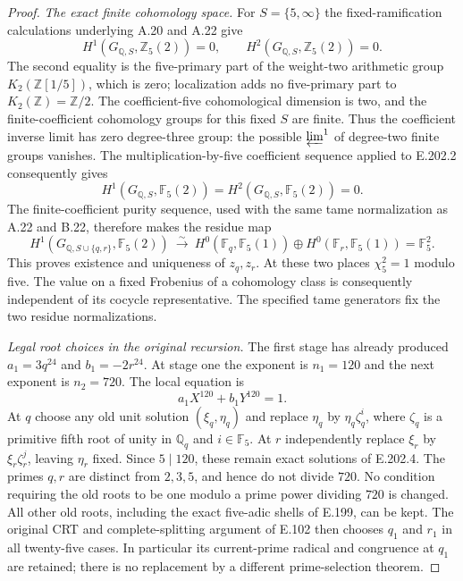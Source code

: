\begin{proof}
\emph{The exact finite cohomology space.}
For $S=\{5,\infty\}$ the fixed-ramification calculations underlying
A.20 and A.22 give
\[
 H^1(G_{\mathbb Q,S},\mathbb Z_5(2))=0,
 \qquad H^2(G_{\mathbb Q,S},\mathbb Z_5(2))=0.
 \tag{E.202.2}
\]
The second equality is the five-primary part of the weight-two
arithmetic group $K_2(\mathbb Z[1/5])$, which is zero; localization
adds no five-primary part to $K_2(\mathbb Z)=\mathbb Z/2$.
The coefficient-five cohomological dimension is two, and the
finite-coefficient cohomology groups for this fixed $S$ are finite.
Thus the coefficient inverse limit has zero degree-three group:
the possible $\varprojlim^1$ of degree-two finite groups vanishes.
The multiplication-by-five coefficient sequence applied to
E.202.2 consequently gives
\[
 H^1(G_{\mathbb Q,S},\mathbb F_5(2))=
 H^2(G_{\mathbb Q,S},\mathbb F_5(2))=0.
\]
The finite-coefficient purity sequence, used with the same tame
normalization as A.22 and B.22, therefore makes the residue map
\[
 H^1(G_{\mathbb Q,S\cup\{q,r\}},\mathbb F_5(2))
 \ \xrightarrow{\sim}\
 H^0(\mathbb F_q,\mathbb F_5(1))\oplus
 H^0(\mathbb F_r,\mathbb F_5(1))=\mathbb F_5^2.
 \tag{E.202.3}
\]
This proves existence and uniqueness of $z_q,z_r$.
At these two places $\chi_5^2=1$ modulo five.  The value on a
fixed Frobenius of a cohomology class is consequently independent
of its cocycle representative.  The specified tame generators
fix the two residue normalizations.

\emph{Legal root choices in the original recursion.}
The first stage has already produced
$a_1=3q^{24}$ and $b_1=-2r^{24}$.
At stage one the exponent is $n_1=120$ and the next exponent is
$n_2=720$.  The local equation is
\[
                  a_1X^{120}+b_1Y^{120}=1.
 \tag{E.202.4}
\]
At $q$ choose any old unit solution $(\xi_q,\eta_q)$ and
replace $\eta_q$ by $\eta_q\zeta_q^i$, where $\zeta_q$ is a
primitive fifth root of unity in $\mathbb Q_q$ and
$i\in\mathbb F_5$.  At $r$ independently replace $\xi_r$ by
$\xi_r\zeta_r^j$, leaving $\eta_r$ fixed.  Since $5\mid120$,
these remain exact solutions of E.202.4.
The primes $q,r$ are distinct from $2,3,5$, and hence do not
divide $720$.  No condition requiring the old roots to be one
modulo a prime power dividing $720$ is changed.  All other old
roots, including the exact five-adic shells of E.199, can be kept.
The original CRT and complete-splitting argument of E.102 then
chooses $q_1$ and $r_1$ in all twenty-five cases.  In particular
its current-prime radical and congruence at $q_1$ are retained;
there is no replacement by a different prime-selection theorem.


\end{proof}
